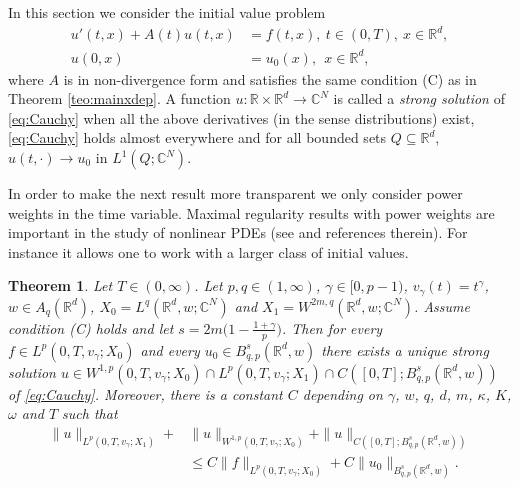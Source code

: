 \documentclass{amsart}
\theoremstyle{plain}
\newtheorem{theorem}{Theorem}[section]
\theoremstyle{remark}
\theoremstyle{plain}
\numberwithin{equation}{section}
\begin{document}
In this section we consider the initial value problem
\begin{equation}\label{eq:Cauchy}
\begin{aligned}
u'(t,x)+A(t)u(t,x)& =f(t,x),\ t\in (0,T), \ x\in { \mathbb{R} }^d,
\\ u(0,x)& =u_0(x),  \ \ x\in { \mathbb{R} }^d,
\end{aligned}
\end{equation}
where $A$ is in non-divergence form and satisfies the same condition (C) as in Theorem \ref{teo:mainxdep}.
A function $u:{ \mathbb{R} }\times{ \mathbb{R} }^d\to { \mathbb{C} }^N$ is called a {\em strong solution} of \eqref{eq:Cauchy} when
all the above derivatives (in the sense distributions) exist, \eqref{eq:Cauchy} holds almost everywhere
and for all bounded sets $Q\subseteq{ \mathbb{R} }^d$, $u(t,\cdot)\to u_0$ in $L^1(Q;{ \mathbb{C} }^N)$.

In order to make the next result more transparent we only consider power weights in the time variable.
Maximal regularity results with power weights are important in the study of nonlinear PDEs (see \cite{Grisvard, KPW, Lun, MS12a, MS12b, PS04} and references therein). For instance it allows one to work with a larger class of initial values.
\begin{theorem}
Let $T\in (0,\infty)$. Let $p,q\in (1,\infty)$, $\gamma\in [0, p-1)$, $v_{\gamma}(t) = t^{\gamma}$, $w\in A_{q}({ \mathbb{R} }^{d})$, $X_0 = L^q({ \mathbb{R} }^d,w;{ \mathbb{C} }^N)$ and $X_1 = W^{2m,q}({ \mathbb{R} }^d,w;{ \mathbb{C} }^N)$. Assume condition (C) holds and let $s = 2m\Big(1-\frac{1+\gamma}{p}\Big)$. Then for every $f\in L^{p}(0,T,v_{\gamma};X_{0})$ and every $u_0\in B^{s}_{q,p}({ \mathbb{R} }^d,w)$ there exists a unique strong solution $u\in W^{1,p}(0,T,v_{\gamma};X_0)\cap L^p(0,T,v_{\gamma};X_1)\cap C([0,T];B^{s}_{q,p}({ \mathbb{R} }^d,w))$ of \eqref{eq:Cauchy}. Moreover, there is a constant $C$ depending on $\gamma$, $w$, $q$, $d$, $m$, $\kappa$, $K$, $\omega$ and $T$ such that
\[\begin{aligned}
\|u\|_{L^p(0,T,v_{\gamma};X_1)}+& \|u\|_{W^{1,p}(0,T,v_{\gamma};X_0)} + \|u\|_{C([0,T];B^{s}_{q,p}({ \mathbb{R} }^d,w))}\\ & \leq C\|f\|_{L^{p}(0,T,v_{\gamma};X_{0})} + C\|u_0\|_{B^{s}_{q,p}({ \mathbb{R} }^d,w)}.
\end{aligned}\]
\end{theorem}
\end{document}

